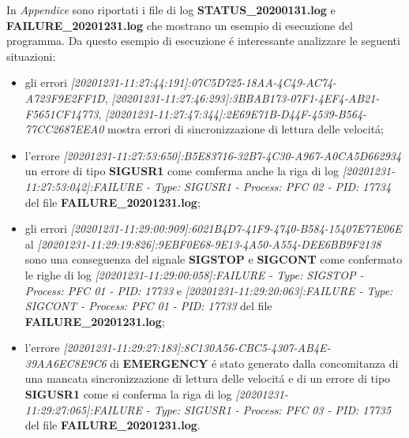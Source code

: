 \documentclass[11pt, oneside]{article}   	%
\begin{document}
In \textit{Appendice} sono riportati i file di log \textbf{STATUS\_20200131.log} e \textbf{FAILURE\_20201231.log} che mostrano un esempio di esecuzione del programma. Da questo esempio di esecuzione \'e interessante analizzare le seguenti situazioni:
\begin{itemize}
	\item gli errori \textit{[20201231-11:27:44:191]:07C5D725-18AA-4C49-AC74-A723F9E2FF1D}, \textit{[20201231-11:27:46:293]:3BBAB173-07F1-4EF4-AB21-F5651CF14773}, \textit{[20201231-11:27:47:344]:2E69E71B-D44F-4539-B564-77CC2687EEA0}  mostra errori di sincronizzazione di lettura delle velocit\'a;
	\item l'errore \textit{[20201231-11:27:53:650]:B5E83716-32B7-4C30-A967-A0CA5D662934} un errore di tipo \textbf{SIGUSR1} come comferma anche la riga di log \textit{[20201231-11:27:53:042]:FAILURE - Type: SIGUSR1 - Process: PFC 02 - PID: 17734} del file \textbf{FAILURE\_20201231.log};
	\item gli errori \textit{[20201231-11:29:00:909]:6021B4D7-41F9-4740-B584-15407E77E06E} al  \textit{[20201231-11:29:19:826]:9EBF0E68-9E13-4A50-A554-DEE6BB9F2138} sono una conseguenza del signale \textbf{SIGSTOP} e \textbf{SIGCONT} come confermato le righe di log \textit{[20201231-11:29:00:058]:FAILURE - Type: SIGSTOP - Process: PFC 01 - PID: 17733} e \textit{[20201231-11:29:20:063]:FAILURE - Type: SIGCONT - Process: PFC 01 - PID: 17733} del file \textbf{FAILURE\_20201231.log};
	\item l'errore \textit{[20201231-11:29:27:183]:8C130A56-CBC5-4307-AB4E-39AA6EC8E9C6}  di \textbf{EMERGENCY} \'e stato generato dalla concomitanza di una mancata sincronizzazione di lettura delle velocit\'a e di un errore di tipo \textbf{SIGUSR1} come si conferma la riga di log \textit{[20201231-11:29:27:065]:FAILURE - Type: SIGUSR1 - Process: PFC 03 - PID: 17735} del file \textbf{FAILURE\_20201231.log}.
\end{itemize}

\newpage
\end{document}

